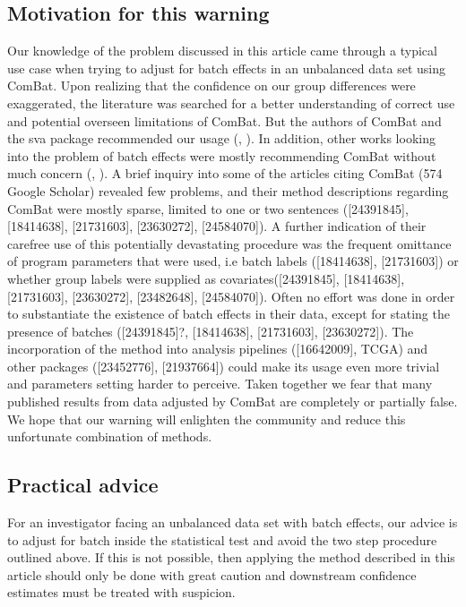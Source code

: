\documentclass{bio}
\newcommand\CITE[1]{{\color{magenta}[#1]}}
\begin{document}
\subsection{Motivation for this warning}

Our knowledge of the problem discussed in this article came through a typical use case when trying to adjust for batch effects in an unbalanced data set using ComBat. Upon realizing that the confidence on our group differences were exaggerated, the literature was searched for a better understanding of correct use and potential overseen limitations of ComBat. But the authors of ComBat and the sva package recommended our usage (\citealp{Johnson2007}, \citealp{Leek2012}). In addition, other works looking into the problem of batch effects were mostly recommending ComBat without much concern (\citealp{Kupfer2012}, \citealp{Kitchen2011}). A brief inquiry into  some of the articles citing ComBat (574 Google Scholar) revealed few problems, and their method descriptions regarding ComBat were mostly sparse, limited to one or two sentences (\CITE{24391845}, \CITE{18414638}, \CITE{21731603}, \CITE{23630272}, \CITE{24584070}). A further indication of their carefree use of this potentially devastating procedure was the frequent omittance of program parameters that were used, i.e batch labels (\CITE{18414638}, \CITE{21731603}) or whether group labels were supplied as covariates(\CITE{24391845}, \CITE{18414638}, \CITE{21731603}, \CITE{23630272}, \CITE{23482648}, \CITE{24584070}). Often no effort was done in order to substantiate the existence of batch effects in their data, except for stating the presence of batches (\CITE{24391845}?, \CITE{18414638}, \CITE{21731603}, \CITE{23630272}). The incorporation of the method into analysis pipelines (\CITE{16642009}, TCGA) and other packages (\CITE{23452776}, \CITE{21937664}) could make its usage even more trivial and parameters setting harder to perceive.
Taken together we fear that many published results from data adjusted by ComBat are completely or partially false. We hope that our warning will enlighten the community and  reduce this unfortunate combination of methods.


\subsection{Practical advice}

For an investigator facing an unbalanced data set with batch effects, our advice is to adjust for batch inside the statistical test and avoid the two step procedure outlined above. If this is not possible, then applying the method described in this article should only be done with great caution and downstream confidence estimates must be treated with suspicion.
\end{document}
